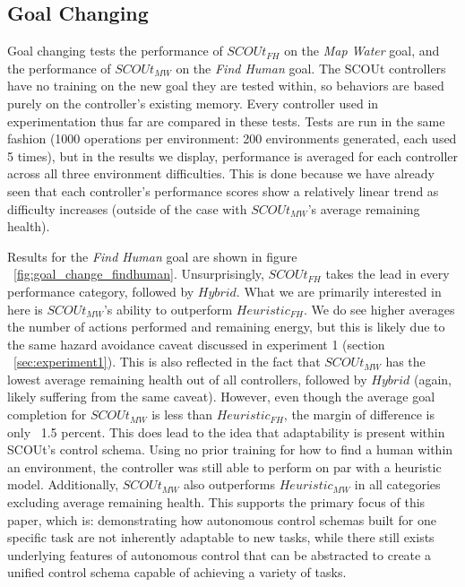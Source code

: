 \subsection{Goal Changing}
Goal changing tests the performance of $SCOUt_{FH}$ on the \textit{Map Water} goal, and the performance of $SCOUt_{MW}$ on the \textit{Find Human} goal.
The SCOUt controllers have no training on the new goal they are tested within, so behaviors are based purely on the controller's existing memory.
Every controller used in experimentation thus far are compared in these tests.
Tests are run in the same fashion (1000 operations per environment: 200 environments generated, each used 5 times), but in the results we display, performance is averaged for each controller across all three environment difficulties.
This is done because we have already seen that each controller's performance scores show a relatively linear trend as difficulty increases (outside of the case with $SCOUt_{MW}$'s average remaining health).

Results for the \textit{Find Human} goal are shown in figure ~\ref{fig:goal_change_findhuman}.
Unsurprisingly, $SCOUt_{FH}$ takes the lead in every performance category, followed by $Hybrid$.
What we are primarily interested in here is $SCOUt_{MW}$'s ability to outperform $Heuristic_{FH}$.
We do see higher averages the number of actions performed and remaining energy, but this is likely due to the same hazard avoidance caveat discussed in experiment 1 (section ~\ref{sec:experiment1}).
This is also reflected in the fact that $SCOUt_{MW}$ has the lowest average remaining health out of all controllers, followed by $Hybrid$ (again, likely suffering from the same caveat).
However, even though the average goal completion for $SCOUt_{MW}$ is less than $Heuristic_{FH}$, the margin of difference is only ~1.5 percent.
This does lead to the idea that adaptability is present within SCOUt's control schema.
Using no prior training for how to find a human within an environment, the controller was still able to perform on par with a heuristic model.
Additionally, $SCOUt_{MW}$ also outperforms $Heuristic_{MW}$ in all categories excluding average remaining health.
This supports the primary focus of this paper, which is: demonstrating how autonomous control schemas built for one specific task are not inherently adaptable to new tasks, while there still exists underlying features of autonomous control that can be abstracted to create a unified control schema capable of achieving a variety of tasks.


